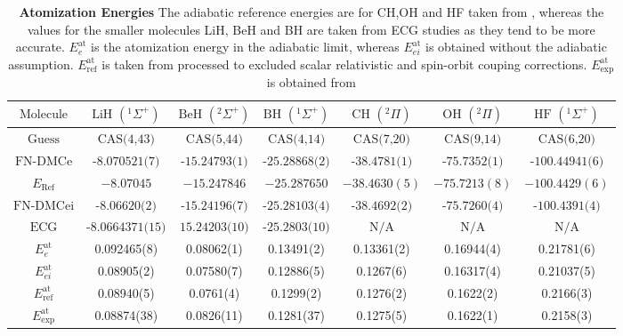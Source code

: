 \documentclass[aps,prl,superscriptaddress,groupedaddress]{revtex4}
\begin{document}
\begin{table}[htpb!]
\setlength{\extrarowheight}{3pt}
\begin{tabular}{*{1}{*{7}{c}}}
\hline\hline
$\text{Molecule}$ & $\text{LiH }(^1\Sigma^+)$ & $\text{BeH }(^2\Sigma^+)$ & $\text{BH }(^1\Sigma^+)$ & $\text{CH }(^2\Pi)$ & $\text{OH }(^2\Pi)$ & $\text{HF }(^1\Sigma^+)$ \\ \hline
$\text{Guess}$ & $\text{CAS(4,43)}$ & $\text{CAS(5,44)}$ & $\text{CAS(4,14)}$ & $\text{CAS(7,20)}$ & $\text{CAS(9,14)}$ & $\text{CAS(6,20)}$ \\
$\text{FN-DMCe}$ & $\text{-8.070521(7)}$ & $\text{-15.24793(1)}$ & $\text{-25.28868(2)}$ & $\text{-38.4781(1)}$ & $\text{-75.7352(1)}$ & $\text{-100.44941(6)}$ \\
$E_{\text{Ref}}$ & $-8.07045$ & $-15.247846$ & $-25.287650$ & $-38.4630(5)$ & $-75.7213(8)$ & $-100.4429(6)$ \\
$\text{FN-DMCei}$ & $\text{-8.06620(2)}$ & $\text{-15.24196(7)}$ & $\text{-25.28103(4)}$ & $\text{-38.4692(2)}$ & $\text{-75.7260(4)}$ & $\text{-100.4391(4)}$ \\
$\text{ECG}$ & $\text{-8.0664371(15)}$ & $\text{15.24203(10)}$ & $\text{-25.2803(10)}$ & $\text{N/A}$ & $\text{N/A}$ & $\text{N/A}$ \\
\hline
$E^{\text{at}}_{e}$ & 0.092465(8) & 0.08062(1) & 0.13491(2) & 0.13361(2) & 0.16944(4) & 0.21781(6) \\
$E^{\text{at}}_{ei}$ & 0.08905(2)  & 0.07580(7)  & 0.12886(5) & 0.1267(6) & 0.16317(4) & 0.21037(5) \\
$E^{\text{at}}_{\text{ref}}$ & 0.08940(5) & 0.0761(4) & 0.1299(2) & 0.1276(2) & 0.1622(2) & 0.2166(3)\\
$E^{\text{at}}_{\text{exp}}$ & 0.08874(38) & 0.0826(11) & 0.1281(37) & 0.1275(5) & 0.1622(1) & 0.2158(3) \\
\hline\hline
\end{tabular}
\caption{\textbf{Atomization Energies} The adiabatic reference energies are for CH,OH and HF taken from \cite{Anderson_Bench}, whereas the values for the smaller molecules LiH, BeH and BH are taken from ECG studies \cite{Adamowicz_LiH,Koput_BeH,Miliordos_BH} as they tend to be more accurate. $E^{\text{at}}_{e}$ is the atomization energy in the adiabatic limit, whereas $E^{\text{at}}_{ei}$ is obtained without the adiabatic assumption. $E^{\text{at}}_{\text{ref}}$ is taken from \cite{Feller_Corrections} processed to excluded scalar relativistic and spin-orbit couping corrections. $E^{\text{at}}_{\text{exp}}$ is obtained from \cite{CCCBDB} \label{tab:atomization}}
\end{table} 
\end{document}
